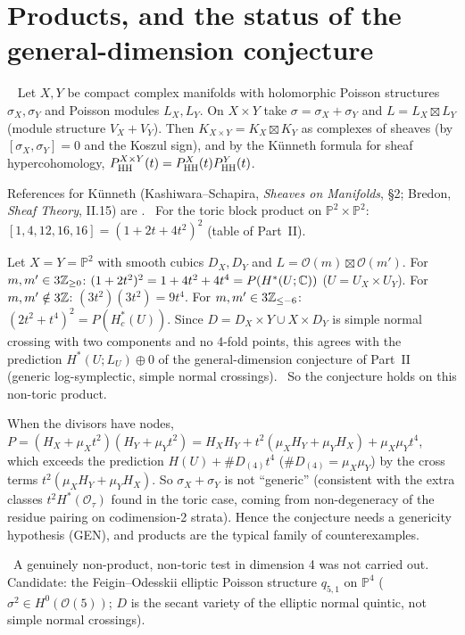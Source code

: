 \section{Products, and the status of the general-dimension conjecture}\label{sec:prod}
\begin{prop}[K\"unneth]\tP\ \tQ\label{prop:Kunneth}
Let $X,Y$ be compact complex manifolds with holomorphic Poisson structures $\sigma_X,\sigma_Y$ and Poisson modules $L_X,L_Y$. On $X\times Y$ take $\sigma=\sigma_X+\sigma_Y$ and $L=L_X\boxtimes L_Y$ (module structure $V_X+V_Y$). Then $K_{X\times Y}=K_X\boxtimes K_Y$ as complexes of sheaves (by $[\sigma_X,\sigma_Y]=0$ and the Koszul sign), and by the K\"unneth formula for sheaf hypercohomology, $P^{X\times Y}_{\mathrm{HH}}(t)=P^X_{\mathrm{HH}}(t)P^Y_{\mathrm{HH}}(t)$.
\end{prop}
\noindent References for K\"unneth (Kashiwara--Schapira, \emph{Sheaves on Manifolds}, \S2; Bredon, \emph{Sheaf Theory}, II.15) are \tQ. \tV\ For the toric block product on $\mathbb P^2\times\mathbb P^2$: $[1,4,12,16,16]=(1+2t+4t^2)^2$ (table of Part~II).
\begin{ex}\tP\label{ex:prod33}
Let $X=Y=\mathbb P^2$ with smooth cubics $D_X,D_Y$ and $L=\mathcal O(m)\boxtimes\mathcal O(m')$. For $m,m'\in3\mathbb Z_{\ge0}$: $(1+2t^2)^2=1+4t^2+4t^4=P(H^*(U;\mathbb C))$ ($U=U_X\times U_Y$). For $m,m'\notin3\mathbb Z$: $(3t^2)(3t^2)=9t^4$. For $m,m'\in3\mathbb Z_{\le-6}$: $(2t^2+t^4)^2=P(H_c^*(U))$. Since $D=D_X\times Y\cup X\times D_Y$ is simple normal crossing with two components and no 4-fold points, this agrees with the prediction $H^*(U;L_U)\oplus0$ of the general-dimension conjecture of Part~II (generic log-symplectic, simple normal crossings). \tP\ So the conjecture holds on this non-toric product.
\end{ex}
\begin{rem}\tP
When the divisors have nodes, $P=(H_X+\mu_Xt^2)(H_Y+\mu_Yt^2)=H_XH_Y+t^2(\mu_XH_Y+\mu_YH_X)+\mu_X\mu_Yt^4$, which exceeds the prediction $H(U)+\#D_{(4)}t^4$ ($\#D_{(4)}=\mu_X\mu_Y$) by the cross terms $t^2(\mu_XH_Y+\mu_YH_X)$. So $\sigma_X+\sigma_Y$ is not ``generic'' (consistent with the extra classes $t^2H^*(\mathcal O_\tau)$ found in the toric case, coming from non-degeneracy of the residue pairing on codimension-2 strata). Hence the conjecture needs a genericity hypothesis (GEN), and products are the typical family of counterexamples.
\end{rem}
\noindent \tK\ A genuinely non-product, non-toric test in dimension 4 was not carried out. Candidate: the Feigin--Odesskii elliptic Poisson structure $q_{5,1}$ on $\mathbb P^4$ ($\sigma^2\in H^0(\mathcal O(5))$; $D$ is the secant variety of the elliptic normal quintic, not simple normal crossings).

